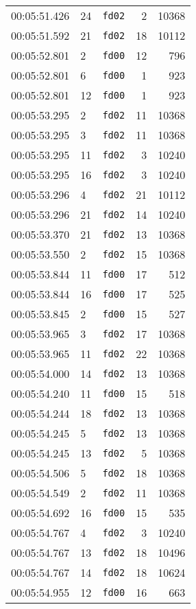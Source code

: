 \documentclass{article}
\begin{document}
\begin{longtable}{lllrr}
00:05:51.426 & 24 & \texttt{fd02} & 2 & 10368 \\
00:05:51.592 & 21 & \texttt{fd02} & 18 & 10112 \\
00:05:52.801 & 2 & \texttt{fd00} & 12 & 796 \\
00:05:52.801 & 6 & \texttt{fd00} & 1 & 923 \\
00:05:52.801 & 12 & \texttt{fd00} & 1 & 923 \\
00:05:53.295 & 2 & \texttt{fd02} & 11 & 10368 \\
00:05:53.295 & 3 & \texttt{fd02} & 11 & 10368 \\
00:05:53.295 & 11 & \texttt{fd02} & 3 & 10240 \\
00:05:53.295 & 16 & \texttt{fd02} & 3 & 10240 \\
00:05:53.296 & 4 & \texttt{fd02} & 21 & 10112 \\
00:05:53.296 & 21 & \texttt{fd02} & 14 & 10240 \\
00:05:53.370 & 21 & \texttt{fd02} & 13 & 10368 \\
00:05:53.550 & 2 & \texttt{fd02} & 15 & 10368 \\
00:05:53.844 & 11 & \texttt{fd00} & 17 & 512 \\
00:05:53.844 & 16 & \texttt{fd00} & 17 & 525 \\
00:05:53.845 & 2 & \texttt{fd00} & 15 & 527 \\
00:05:53.965 & 3 & \texttt{fd02} & 17 & 10368 \\
00:05:53.965 & 11 & \texttt{fd02} & 22 & 10368 \\
00:05:54.000 & 14 & \texttt{fd02} & 13 & 10368 \\
00:05:54.240 & 11 & \texttt{fd00} & 15 & 518 \\
00:05:54.244 & 18 & \texttt{fd02} & 13 & 10368 \\
00:05:54.245 & 5 & \texttt{fd02} & 13 & 10368 \\
00:05:54.245 & 13 & \texttt{fd02} & 5 & 10368 \\
00:05:54.506 & 5 & \texttt{fd02} & 18 & 10368 \\
00:05:54.549 & 2 & \texttt{fd02} & 11 & 10368 \\
00:05:54.692 & 16 & \texttt{fd00} & 15 & 535 \\
00:05:54.767 & 4 & \texttt{fd02} & 3 & 10240 \\
00:05:54.767 & 13 & \texttt{fd02} & 18 & 10496 \\
00:05:54.767 & 14 & \texttt{fd02} & 18 & 10624 \\
00:05:54.955 & 12 & \texttt{fd00} & 16 & 663 \\

\end{longtable}
\end{document}
